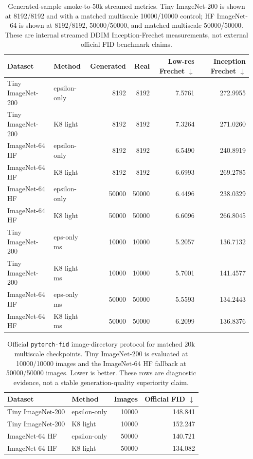 \documentclass[11pt]{article}
\begin{document}
\begin{table}[t]
  \centering
  \small
  \caption{Generated-sample smoke-to-50k streamed metrics. Tiny ImageNet-200 is
  shown at 8192/8192 and with a matched multiscale 10000/10000 control; HF
  ImageNet-64 is shown at 8192/8192, 50000/50000, and matched multiscale
  50000/50000. These are internal streamed DDIM Inception-Frechet measurements,
  not external official FID benchmark claims.}
  \label{tab:generated}
  \begin{tabular}{llrrrr}
    \toprule
    Dataset & Method & Generated & Real & Low-res Frechet $\downarrow$ & Inception Frechet $\downarrow$ \\
    \midrule
    Tiny ImageNet-200 & epsilon-only & 8192 & 8192 & 7.5761 & 272.9955 \\
    Tiny ImageNet-200 & K8 light & 8192 & 8192 & 7.3264 & 271.0260 \\
    ImageNet-64 HF & epsilon-only & 8192 & 8192 & 6.5490 & 240.8919 \\
    ImageNet-64 HF & K8 light & 8192 & 8192 & 6.6993 & 269.2785 \\
    ImageNet-64 HF & epsilon-only & 50000 & 50000 & 6.4496 & 238.0329 \\
    ImageNet-64 HF & K8 light & 50000 & 50000 & 6.6096 & 266.8045 \\
    Tiny ImageNet-200 & eps-only ms & 10000 & 10000 & 5.2057 & 136.7132 \\
    Tiny ImageNet-200 & K8 light ms & 10000 & 10000 & 5.7001 & 141.4577 \\
    ImageNet-64 HF & eps-only ms & 50000 & 50000 & 5.5593 & 134.2443 \\
    ImageNet-64 HF & K8 light ms & 50000 & 50000 & 6.2099 & 136.8376 \\
    \bottomrule
  \end{tabular}
\end{table}

\begin{table}[t]
  \centering
  \small
  \caption{Official \texttt{pytorch-fid} image-directory protocol for matched
  20k multiscale checkpoints. Tiny ImageNet-200 is evaluated at 10000/10000
  images and the ImageNet-64 HF fallback at 50000/50000 images. Lower is
  better. These rows are diagnostic evidence, not a stable generation-quality
  superiority claim.}
  \label{tab:official-fid}
  \begin{tabular}{llrr}
    \toprule
    Dataset & Method & Images & Official FID $\downarrow$ \\
    \midrule
    Tiny ImageNet-200 & epsilon-only & 10000 & 148.841 \\
    Tiny ImageNet-200 & K8 light & 10000 & 152.247 \\
    ImageNet-64 HF & epsilon-only & 50000 & 140.721 \\
    ImageNet-64 HF & K8 light & 50000 & 134.082 \\
    \bottomrule
  \end{tabular}
\end{table}
\end{document}
